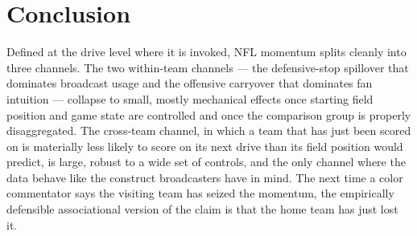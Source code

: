 \documentclass[11pt]{article}
\begin{document}
\section{Conclusion}\label{sec:concl}

Defined at the drive level where it is invoked, NFL momentum splits cleanly
into three channels. The two within-team channels --- the defensive-stop
spillover that dominates broadcast usage and the offensive carryover that
dominates fan intuition --- collapse to small, mostly mechanical effects
once starting field position and game state are controlled and once the
comparison group is properly disaggregated. The cross-team channel, in which
a team that has just been scored on is materially less likely to score on
its next drive than its field position would predict, is large, robust to a
wide set of controls, and the only channel where the data behave like the
construct broadcasters have in mind. The next time a color commentator
says the visiting team has seized the momentum, the empirically defensible
associational version of the claim is that the home team has just lost it.



\end{document}
